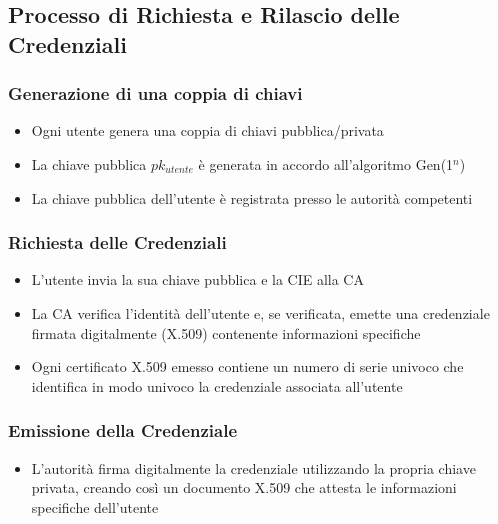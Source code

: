         \subsection{Processo di Richiesta e Rilascio delle Credenziali}
            
            \subsubsection{Generazione di una coppia di chiavi}
                \begin{itemize}
                    \item Ogni utente genera una coppia di chiavi pubblica/privata
    
                    \item La chiave pubblica $pk_{utente}$ è generata in accordo all'algoritmo Gen(1$^n$)
                    
                    \item La chiave pubblica dell'utente è registrata presso le autorità competenti
                \end{itemize}
            
            \subsubsection{Richiesta delle Credenziali}
                \begin{itemize}
                    \item  L'utente invia la sua chiave pubblica e la CIE alla CA
                    
                    \item La CA verifica l'identità dell'utente e, se verificata, emette una credenziale firmata digitalmente (X.509) contenente informazioni specifiche
    
                    \item Ogni certificato X.509 emesso contiene un numero di serie univoco che identifica in modo univoco la credenziale associata all'utente
                \end{itemize}
    
            \subsubsection{Emissione della Credenziale}
                \begin{itemize}
                    \item L'autorità firma digitalmente la credenziale utilizzando la propria chiave privata, creando così un documento X.509 che attesta le informazioni specifiche dell'utente
                \end{itemize}
    
